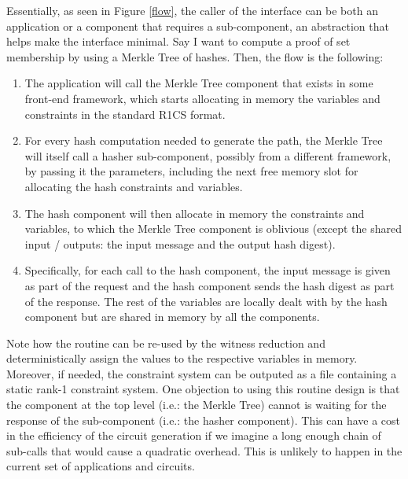         Essentially, as seen in Figure \ref{flow}, the caller of the interface can be both an application or a component that requires a sub-component, an abstraction that helps make the interface minimal. Say I want to compute a proof of set membership by using a Merkle Tree of hashes. Then, the flow is the following:
        \begin{enumerate} 
            \item The application will call the Merkle Tree component that exists in some front-end framework, which starts allocating in memory the variables and constraints in the standard R1CS format.
            \item For every hash computation needed to generate the path, the Merkle Tree will itself call a hasher sub-component, possibly from a different framework, by passing it the parameters, including the next free memory slot for allocating the hash constraints and variables.
            \item The hash component will then allocate in memory the constraints and variables, to which the Merkle Tree component is oblivious (except the shared input / outputs: the input message and the output hash digest).
            \item Specifically, for each call to the hash component, the input message is given as part of the request and the hash component sends the hash digest as part of the response. The rest of the variables are locally dealt with by the hash component but are shared in memory by all the components.
        \end{enumerate}
        
        Note how the routine can be re-used by the witness reduction and deterministically assign the values to the respective variables in memory. Moreover, if needed, the constraint system can be outputed as a file containing a static rank-1 constraint system. One objection to using this routine design is that the component at the top level (i.e.: the Merkle Tree) cannot is waiting for the response of the sub-component (i.e.: the hasher component). This can have a cost in the efficiency of the circuit generation if we imagine a long enough chain of sub-calls that would cause a quadratic overhead. This is unlikely to happen in the current set of applications and circuits. 
		
